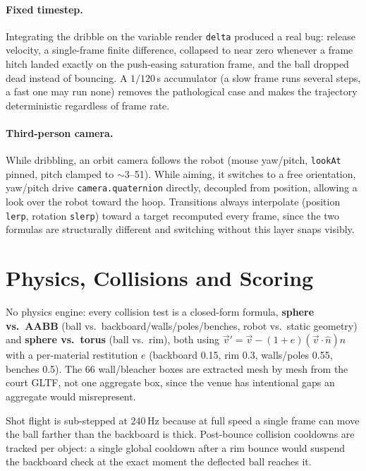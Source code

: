 \documentclass[11pt,a4paper]{article}
\newcommand{\code}[1]{\texttt{#1}}
\begin{document}
\paragraph{Fixed timestep.} Integrating the dribble on the variable render \code{delta} produced a real bug: release velocity, a single-frame finite difference, collapsed to near zero whenever a frame hitch landed exactly on the push-easing saturation frame, and the ball dropped dead instead of bouncing. A $1/120$\,s accumulator (a slow frame runs several steps, a fast one may run none) removes the pathological case and makes the trajectory deterministic regardless of frame rate.

\paragraph{Third-person camera.} While dribbling, an orbit camera follows the robot (mouse yaw/pitch, \code{lookAt} pinned, pitch clamped to $\sim$3--51\textdegree). While aiming, it switches to a free orientation, yaw/pitch drive \code{camera.quaternion} directly, decoupled from position, allowing a look over the robot toward the hoop. Transitions always interpolate (position \code{lerp}, rotation \code{slerp}) toward a target recomputed every frame, since the two formulas are structurally different and switching without this layer snaps visibly.

\section{Physics, Collisions and Scoring}
\label{sec:physics}

No physics engine: every collision test is a closed-form formula, \textbf{sphere vs.\ AABB} (ball vs.\ backboard/walls/poles/benches, robot vs.\ static geometry) and \textbf{sphere vs.\ torus} (ball vs.\ rim), both using $\vec{v}' = \vec{v} - (1+e)(\vec{v}\cdot\hat{n})\hat{n}$ with a per-material restitution $e$ (backboard 0.15, rim 0.3, walls/poles 0.55, benches 0.5). The 66 wall/bleacher boxes are extracted mesh by mesh from the court GLTF, not one aggregate box, since the venue has intentional gaps an aggregate would misrepresent.

Shot flight is sub-stepped at 240\,Hz because at full speed a single frame can move the ball farther than the backboard is thick. Post-bounce collision cooldowns are tracked per object: a single global cooldown after a rim bounce would suspend the backboard check at the exact moment the deflected ball reaches it.
\end{document}
